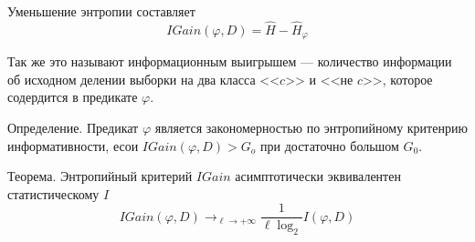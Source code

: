     Уменьшение энтропии составляет
    \[
    IGain(\varphi, D) = \hat{H} - \hat{H}_{\varphi}
    \]

    Так же это называют информационным выигрышем --- количество информации об исходном
    делении выборки на два класса <<$c$>> и <<не $c$>>, которое содердится в предикате
    $\varphi$.

    Определение.
    Предикат $\varphi$ является закономерностью по энтропийному критенрию информативности,
    есои $IGain(\varphi, D) > G_o$ при достаточно большом $G_0$.

    Теорема.
    Энтропийный критерий $IGain$ асимптотически эквивалентен статистическому $I$
    \[
    IGain(\varphi, D) \rightarrow_{\ell \rightarrow +\infty} \frac{1}{\ell \log_2} I(\varphi, D)
    \]
